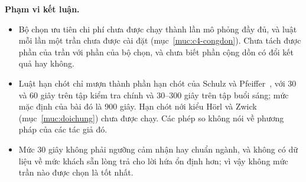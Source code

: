 \textbf{Phạm vi kết luận.}
\begin{itemize}[leftmargin=1.2cm,itemsep=2pt,topsep=3pt]
\item Bộ chọn ưu tiên chi phí chưa được chạy thành lần mô phỏng đầy đủ, và luật mỗi lần một trần chưa được cài đặt
(mục~\ref{muc:c4-congdon}). Chưa tách được phần của trần với phần của bộ chọn, và chưa biết phần cộng dồn có đổi kết quả
hay không.
\item Luật hạn chót chỉ mượn thành phần hạn chót của Schulz và Pfeiffer~\cite{schulz2026}, với 30 và 60 giây trên tập
kiểm tra chính và 30--300 giây trên tập buổi sáng; mức mặc định của bài đó là 900 giây. Hạn chót nới kiểu Hörl và
Zwick~\cite{horl2022} (mục~\ref{muc:doichung}) chưa được chạy. Các phép so không nói về phương pháp của các tác giả đó.
\item Mức 30 giây không phải ngưỡng cảm nhận hay chuẩn ngành, và không có dữ liệu về mức khách sẵn lòng trả cho lời
hứa ổn định hơn; vì vậy không mức trần nào được chọn là tốt nhất.
\end{itemize}
